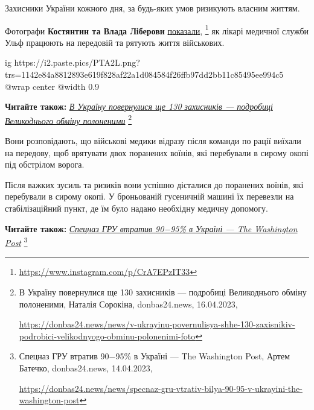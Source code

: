 Захисники України кожного дня, за будь-яких умов ризикують власним життям.

Фотографи \textbf{Костянтин та Влада Ліберови} \href{https://www.instagram.com/p/CrA7EPzIT33}{показали},%
\footnote{\url{https://www.instagram.com/p/CrA7EPzIT33}} як лікарі медичної
служби Ульф працюють на передовій та рятують життя військових.

\ifcmt
  ig https://i2.paste.pics/PTA2L.png?trs=1142e84a8812893e619f828af22a1d084584f26ffb97dd2bb11c85495ee994c5
  @wrap center
  @width 0.9
\fi

\textbf{Читайте також:} \href{https://donbas24.news/news/v-ukrayinu-povernulisya-shhe-130-zaxisnikiv-podrobici-velikodnyogo-obminu-polonenimi-foto}{\emph{В Україну повернулися ще 130 захисників — подробиці Великоднього обміну полоненими}}%
\footnote{В Україну повернулися ще 130 захисників — подробиці Великоднього обміну полоненими, Наталія Сорокіна, donbas24.news, 16.04.2023, \par%
\url{https://donbas24.news/news/v-ukrayinu-povernulisya-shhe-130-zaxisnikiv-podrobici-velikodnyogo-obminu-polonenimi-foto}%
}

Вони розповідають, що військові медики відразу після команди по рації виїхали
на передову, щоб врятувати двох поранених воїнів, які перебували в сирому окопі
під обстрілом ворога.


Після важких зусиль та ризиків вони успішно дісталися до поранених воїнів, які
перебували в сирому окопі. У броньованій гусеничній машині їх перевезли на
стабілізаційний пункт, де їм було надано необхідну медичну допомогу.

\textbf{Читайте також:} \href{https://donbas24.news/news/specnaz-gru-vtrativ-bilya-90-95-v-ukrayini-the-washington-post}{\emph{Спецназ ГРУ втратив 90−95\% в Україні — The Washington Post}}%
\footnote{Спецназ ГРУ втратив 90−95\% в Україні — The Washington Post, Артем Батечко, donbas24.news, 14.04.2023, \par%
\url{https://donbas24.news/news/specnaz-gru-vtrativ-bilya-90-95-v-ukrayini-the-washington-post}%
}


